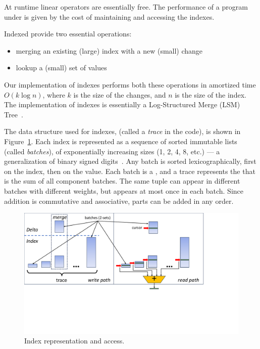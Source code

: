 At runtime linear operators are essentially free.  The performance of
a \dbsp program under is given by the cost of maintaining and
accessing the indexes.

Indexed provide two essential operations:
\begin{itemize}
\item merging an existing (large) index with a new (small) change
\item lookup a (small) set of values
\end{itemize}

Our implementation of indexes performs both these operations in
amortized time $O(k \log n)$, where $k$ is the size of the changes,
and $n$ is the size of the index.  The implementation of indexes is
essentially a Log-Structured Merge (LSM) Tree~\cite{oneil-ai96}.

The data structure used for indexes, (called a \emph{trace} in the
code), is shown in Figure~\ref{fig:trace}.  Each index is represented
as a sequence of sorted immutable lists (called \emph{batches}), of
exponentially increasing sizes (1, 2, 4, 8, etc.) --- a generalization
of binary signed digits~\cite{signed-digits}.  Any batch is sorted
lexicographically, first on the index, then on the value.  Each batch
is a \zr, and a trace represents the \zr that is the sum of all
component batches.  The same tuple can appear in different batches
with different weights, but appears at most once in each batch.  Since
addition is commutative and associative, parts can be added in any
order.

\begin{figure}[h]
  \begin{center}
    \includegraphics[trim={0 2.9in 2.1in 0},clip,scale=.27]{trace.pdf}
    \caption{\label{fig:trace}Index representation and access.}
  \end{center}
\end{figure}

